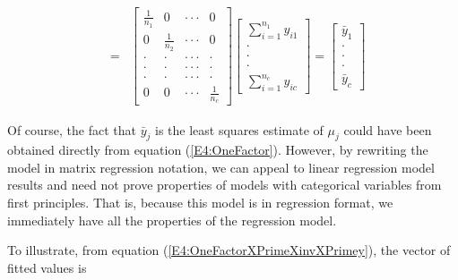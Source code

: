 \begin{center}
\begin{eqnarray}
\\
&=&%
\begin{bmatrix}
\frac{1}{n_1} & 0 & \cdot \cdot \cdot  & 0 \\
0 & \frac{1}{n_2} & \cdot \cdot \cdot  & 0 \\
\cdot  & \cdot  & \cdot \cdot \cdot  & \cdot  \\
\cdot  & \cdot  & \cdot \cdot \cdot  & \cdot  \\
\cdot  & \cdot  & \cdot \cdot \cdot  & \cdot  \\
0 & 0 & \cdot \cdot \cdot  & \frac{1}{n_c}
\end{bmatrix}
\begin{bmatrix}
\sum_{i=1}^{n_{1}}y_{i1} \\
\cdot  \\
\cdot  \\
\cdot  \\
\sum_{i=1}^{n_{c}}y_{ic}%
\end{bmatrix}%
=%
\begin{bmatrix}
\bar{y}_{1} \\
\cdot  \\
\cdot  \\
\cdot  \\
\bar{y}_{c}%
\end{bmatrix}%
\end{eqnarray}
\end{center}

Of course, the fact that $\bar{y}_{j}$ is the least squares estimate
of $\mu_{j}$ could have been obtained directly from equation
(\ref{E4:OneFactor}). However, by rewriting the model in matrix
regression notation, we can appeal to linear regression model
results and need not prove properties of models with categorical
variables from first principles. That is, because this model is in
regression format, we immediately have all the properties of the
regression model.

To illustrate, from equation (\ref{E4:OneFactorXPrimeXinvXPrimey}),
the vector of fitted values is

